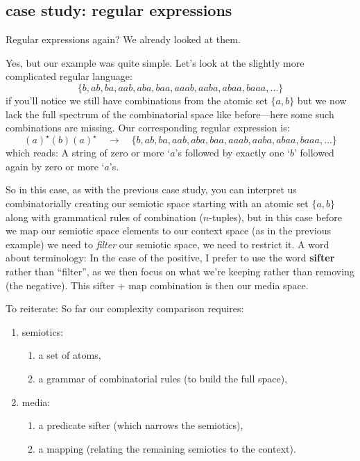 \documentclass[twoside]{article}
\begin{document}
\subsection*{case study: regular expressions}

Regular expressions again? We already looked at them.

Yes, but our example was quite simple. Let's look at the slightly more complicated regular language:
$$ \{b,ab,ba,aab,aba,baa,aaab,aaba,abaa,baaa,\ldots\} $$
if you'll notice we still have combinations from the atomic set $ \{a,b\} $ but we now lack the full spectrum of the
combinatorial space like before---here some such combinations are missing. Our corresponding regular expression is:
$$ (a)^\star(b)(a)^\star\quad\to\quad\{b,ab,ba,aab,aba,baa,aaab,aaba,abaa,baaa,\ldots\} $$
which reads: A string of zero or more `$ a $'s followed by exactly one `$ b $' followed again by zero or more `$ a $'s.

So in this case, as with the previous case study, you can interpret us combinatorially creating our semiotic space starting
with an atomic set $ \{a, b\} $ along with grammatical rules of combination ($ n $-tuples), but in this case before we map
our semiotic space elements to our context space (as in the previous example) we need to \emph{filter} our semiotic space,
we need to restrict it.  A word about terminology: In the case of the positive, I prefer to use the word {\bfseries sifter}
rather than ``filter'', as we then focus on what we're keeping rather than removing (the negative).
This sifter + map combination is then our media space.

To reiterate: So far our complexity comparison requires:

\begin{enumerate}
\item semiotics:
\begin{enumerate}
\item a set of atoms,
\item a grammar of combinatorial rules (to build the full space),
\end{enumerate}
\item media:
\begin{enumerate}
\item a predicate sifter (which narrows the semiotics),
\item a mapping (relating the remaining semiotics to the context).
\end{enumerate}
\end{enumerate}
\end{document}
